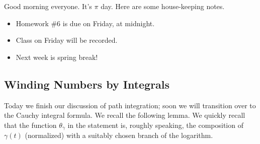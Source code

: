 \documentclass[../notes.tex]{subfiles}
\begin{document}

Good morning everyone. It's $\pi$ day. Here are some house-keeping notes.
\begin{itemize}
	\item Homework \#6 is due on Friday, at midnight.
	\item Class on Friday will be recorded.
	\item Next week is spring break!
\end{itemize}

\subsection{Winding Numbers by Integrals}
Today we finish our discussion of path integration; soon we will transition over to the Cauchy integral formula. We recall the following lemma.
\windingnumber*
\noindent We quickly recall that the function $\theta_\gamma$ in the statement is, roughly speaking, the composition of $\gamma(t)$ (normalized) with a suitably chosen branch of the logarithm.
\end{document}
